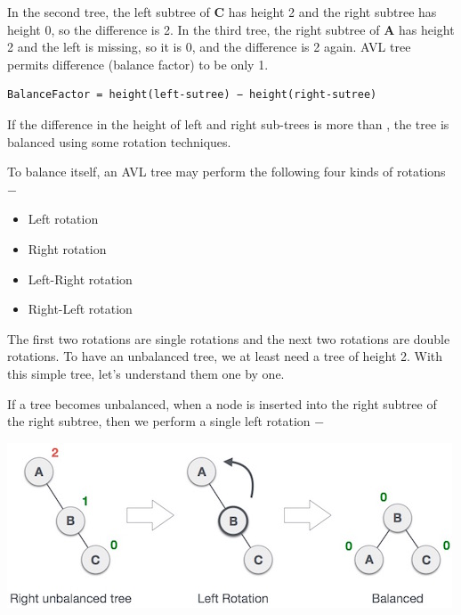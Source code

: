In the second tree, the left subtree of \textbf{C} has height 2 and the right subtree has height 0, so the difference is 2. In the third tree, the right subtree of \textbf{A} has height 2 and the left is missing, so it is 0, and the difference is 2 again. AVL tree permits difference (balance factor) to be only 1.

\begin{verbatim}
BalanceFactor = height(left-sutree) − height(right-sutree)
\end{verbatim}

If the difference in the height of left and right sub-trees is more than , the tree is balanced using some rotation techniques.

\newpage
\hypertarget{avl-rotations}{%
\label{avl-rotations}}

To balance itself, an AVL tree may perform the following four kinds of rotations −

\begin{itemize}
\tightlist
\item
  Left rotation
\item
  Right rotation
\item
  Left-Right rotation
\item
  Right-Left rotation
\end{itemize}

The first two rotations are single rotations and the next two rotations are double rotations. To have an unbalanced tree, we at least need a tree of height 2. With this simple tree, let's understand them one by one.

\hypertarget{left-rotation}{%
\label{left-rotation}}

If a tree becomes unbalanced, when a node is inserted into the right subtree of the right subtree, then we perform a single left rotation −

\begin{center}
\includegraphics[scale=.60]{images/avl_left_rotation.jpg}
\end{center}

